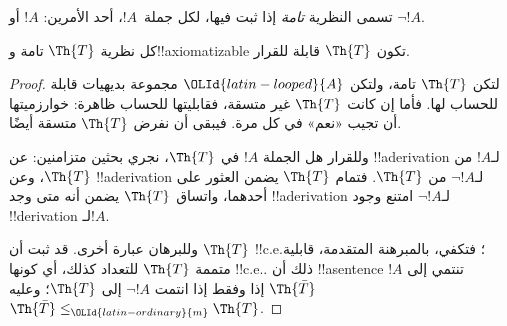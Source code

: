 \documentclass[../../../include/open-logic-section]{subfiles}
\begin{document}


تسمى النظرية {\em تامة} إذا ثبت فيها، لكل جملة~$!A$، أحد الأمرين:
$!A$ أو $\lnot !A$.

\begin{lem}
كل نظرية $\Th{T}$ تامة و!!{axiomatizable} تكون
$\Th{T}$ قابلة للقرار.
\end{lem}

\begin{proof}
لتكن $\Th{T}$ تامة، ولتكن ${\OLId{latin-looped}{A}}$ مجموعة بديهيات قابلة للحساب لها.
فأما إن كانت $\Th{T}$ غير متسقة، فقابليتها للحساب ظاهرة:
خوارزميتها أن تجيب «نعم» في كل مرة. فيبقى أن نفرض $\Th{T}$
متسقة أيضًا.

وللقرار هل الجملة $!A$ في $\Th{T}$، نجري بحثين متزامنين:
عن !!a{derivation} لـ$!A$ من $\Th{T}$، وعن !!a{derivation}
لـ$\lnot
!A$ من $\Th{T}$. فتمام $\Th{T}$ يضمن العثور على أحدهما،
واتساق $\Th{T}$ يضمن أنه متى وجد !!a{derivation} لـ$\lnot !A$
امتنع وجود !!{derivation} لـ$!A$.

وللبرهان عبارة أخرى. قد ثبت أن $\Th{T}$ !!{c.e.}؛ فتكفي، بالمبرهنة
المتقدمة، قابلية متممة $\Th{T}$ للتعداد كذلك، أي كونها
!!{c.e.}. ذلك أن !!a{sentence} $!A$ تنتمي إلى $\Th{\bar T}$ إذا
وفقط إذا انتمت $\lnot !A$ إلى $\Th{T}$؛ وعليه
$\Th{\bar T}\leq_{\OLId{latin-ordinary}{m}}\Th{T}$.
\end{proof}
\end{document}
